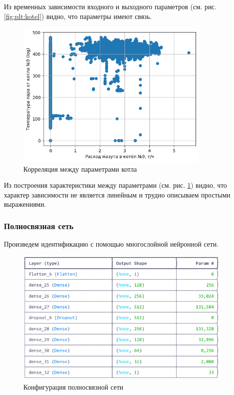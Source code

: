 Из временных зависимости входного и выходного параметров (см. рис.
\ref{fig:plt:kotel}) видно, что параметры имеют связь. 

\begin{figure}[H]
  \begin{center}
    \includegraphics[width=0.85\textwidth]{figures/plots/kotel_temp_mazut_rel.png}
  \end{center}
  \caption{Корреляция между параметрами котла}\label{fig:plt:kotel:rel}
\end{figure}

Из построения характеристики между параметрами (см. рис.
\ref{fig:plt:kotel:rel}) видно, что характер зависимости не является
линейным и трудно описываем простыми выражениями. 

\subsubsection{Полносвязная сеть}

Произведем идентификацию с помощью многослойной
нейронной сети. 

\begin{figure}[H]
  \begin{center}
    \includegraphics[width=0.95\textwidth]{figures/tensorflow/dense.png}
  \end{center}
  \caption{Конфигурация полносвязной сети}\label{fig:tf:dense}
\end{figure}

